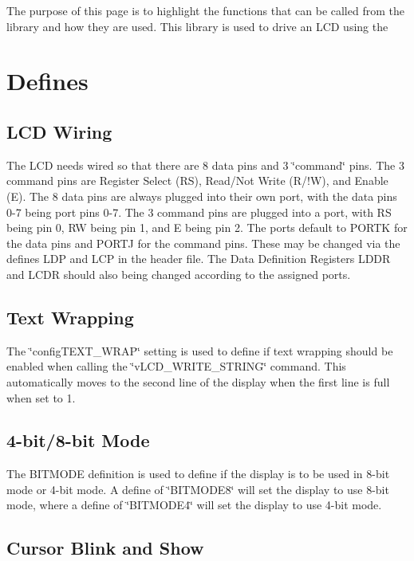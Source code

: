The purpose of this page is to highlight the functions that can be called from the library and how they are used. This library is used to drive an L\-C\-D using the\hypertarget{_usage_Defines}{}\section{Defines}\label{_usage_Defines}
\hypertarget{_usage_Wiring}{}\subsection{L\-C\-D Wiring}\label{_usage_Wiring}
The L\-C\-D needs wired so that there are 8 data pins and 3 \char`\"{}command\char`\"{} pins. The 3 command pins are Register Select (R\-S), Read/\-Not Write (R/!\-W), and Enable (E). The 8 data pins are always plugged into their own port, with the data pins 0-\/7 being port pins 0-\/7. The 3 command pins are plugged into a port, with R\-S being pin 0, R\-W being pin 1, and E being pin 2. The ports default to P\-O\-R\-T\-K for the data pins and P\-O\-R\-T\-J for the command pins. These may be changed via the defines L\-D\-P and L\-C\-P in the header file. The Data Definition Registers L\-D\-D\-R and L\-C\-D\-R should also being changed according to the assigned ports.\hypertarget{_usage_wrap}{}\subsection{Text Wrapping}\label{_usage_wrap}
The \char`\"{}config\-T\-E\-X\-T\-\_\-\-W\-R\-A\-P\char`\"{} setting is used to define if text wrapping should be enabled when calling the \char`\"{}v\-L\-C\-D\-\_\-\-W\-R\-I\-T\-E\-\_\-\-S\-T\-R\-I\-N\-G\char`\"{} command. This automatically moves to the second line of the display when the first line is full when set to 1.\hypertarget{_usage_bitmode}{}\subsection{4-\/bit/8-\/bit Mode}\label{_usage_bitmode}
The B\-I\-T\-M\-O\-D\-E definition is used to define if the display is to be used in 8-\/bit mode or 4-\/bit mode. A define of \char`\"{}\-B\-I\-T\-M\-O\-D\-E8\char`\"{} will set the display to use 8-\/bit mode, where a define of \char`\"{}\-B\-I\-T\-M\-O\-D\-E4\char`\"{} will set the display to use 4-\/bit mode.\hypertarget{_usage_Cursor}{}\subsection{Cursor Blink and Show}\label{_usage_Cursor}
